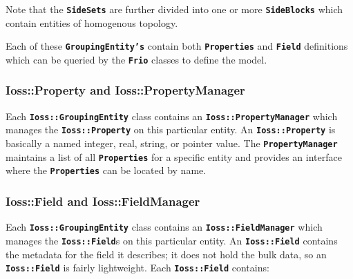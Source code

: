 \documentclass[11pt,twoside]{article}
\newcommand{\code}[1]
   {\mbox{\bf\tt #1}\null}
\begin{document}
Note that the \code{SideSets} are further divided into one or more
\code{SideBlocks} which contain entities of homogenous topology.

Each of these \code{GroupingEntity's} contain both
\code{Properties} and \code{Field} definitions
which can be queried by the \code{Frio} classes to define the
model.

\subsubsection{Ioss::Property and Ioss::PropertyManager}
Each \code{Ioss::GroupingEntity} class contains an
\code{Ioss::PropertyManager} which manages the
\code{Ioss::Property} on this particular entity. An
\code{Ioss::Property} is basically a named integer, real,
string, or pointer value. The \code{PropertyManager}
maintains a list of all \code{Properties} for a specific
entity and provides an interface where the \code{Properties}
can be located by name.

\subsubsection{Ioss::Field and Ioss::FieldManager}
Each \code{Ioss::GroupingEntity} class contains an
\code{Ioss::FieldManager} which manages the
\code{Ioss::Field}s on this particular entity. An
\code{Ioss::Field} contains the metadata for the field it
describes; it does not hold the bulk data, so an
\code{Ioss::Field} is fairly lightweight. Each
\code{Ioss::Field} contains:
\end{document}
